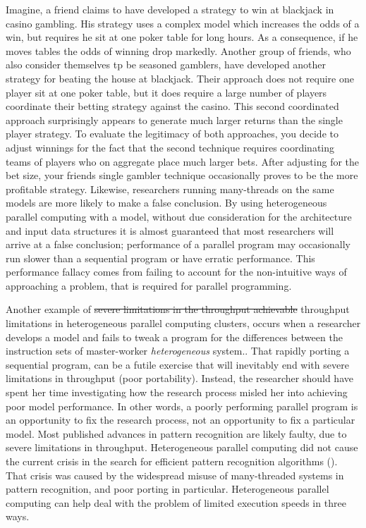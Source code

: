 \documentclass[10pt]{article}[draft]
\begin{document}
		Imagine, a friend claims to have developed a strategy to win at blackjack in casino gambling. His strategy uses a complex model which increases the odds of a win, but requires he sit at one poker table for long hours. As a consequence, if he moves tables the odds of winning drop markedly. Another group of friends, who also consider themselves tp be seasoned gamblers, have developed another strategy for beating the house at blackjack. Their approach does not require one player sit at one poker table, but it does require a large number of players coordinate their betting strategy against the casino. This second coordinated approach surprisingly appears to generate much larger returns than the single player strategy. To evaluate the legitimacy of both approaches, you decide to adjust winnings for the fact that the second technique requires coordinating teams of players who on aggregate place much larger bets. After adjusting for the bet size, your friends single gambler technique occasionally proves to be the more profitable strategy. Likewise, researchers running many-threads on the same models are more likely to make a false conclusion. By using heterogeneous parallel computing  with a model, without due consideration for the architecture and input data structures it is almost guaranteed that most researchers will arrive at a false conclusion; performance of a parallel program may occasionally run slower than a sequential program or have erratic performance. This performance fallacy comes from failing to account for the non-intuitive ways of approaching  a problem, that is required for parallel programming. 
		
		Another example of \st{severe  limitations in the throughput achievable} throughput limitations in heterogeneous parallel computing clusters, occurs when a researcher develops a model and fails to tweak a program for the differences between the  instruction sets of master-worker \emph{heterogeneous} system.. That rapidly porting a sequential program, can be a futile exercise that will inevitably end with severe limitations in throughput (poor portability). Instead, the researcher should have spent her time investigating how the research process misled her into achieving poor model performance. In other words, a poorly performing parallel program is an opportunity to fix the research process, not an opportunity to fix a particular model. Most published advances in pattern recognition are likely faulty, due to severe limitations in throughput. Heterogeneous parallel computing did not cause the current crisis in the search for efficient pattern recognition algorithms (). That crisis was caused by the widespread misuse of many-threaded systems in pattern recognition, and poor porting in particular. Heterogeneous parallel computing can help deal with the problem of limited execution speeds in three ways. 
		  
\end{document}
